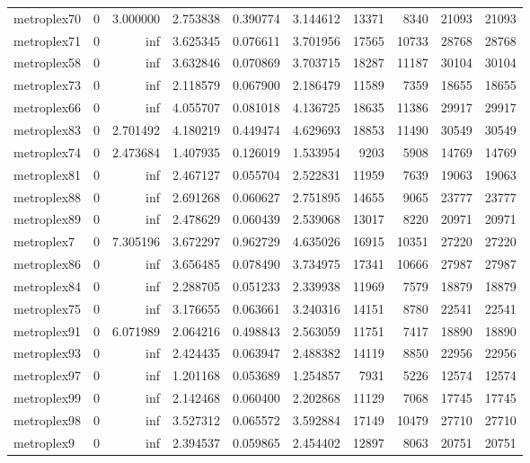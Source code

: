 \begin{longtable}{|l|r|r|r|r|r|r|r|r|r|}
metroplex70 & 0 & 3.000000 & 2.753838 & 0.390774 & 3.144612 & 13371 & 8340 & 21093 & 21093 \\
metroplex71 & 0 & inf & 3.625345 & 0.076611 & 3.701956 & 17565 & 10733 & 28768 & 28768 \\
metroplex58 & 0 & inf & 3.632846 & 0.070869 & 3.703715 & 18287 & 11187 & 30104 & 30104 \\
metroplex73 & 0 & inf & 2.118579 & 0.067900 & 2.186479 & 11589 & 7359 & 18655 & 18655 \\
metroplex66 & 0 & inf & 4.055707 & 0.081018 & 4.136725 & 18635 & 11386 & 29917 & 29917 \\
metroplex83 & 0 & 2.701492 & 4.180219 & 0.449474 & 4.629693 & 18853 & 11490 & 30549 & 30549 \\
metroplex74 & 0 & 2.473684 & 1.407935 & 0.126019 & 1.533954 & 9203 & 5908 & 14769 & 14769 \\
metroplex81 & 0 & inf & 2.467127 & 0.055704 & 2.522831 & 11959 & 7639 & 19063 & 19063 \\
metroplex88 & 0 & inf & 2.691268 & 0.060627 & 2.751895 & 14655 & 9065 & 23777 & 23777 \\
metroplex89 & 0 & inf & 2.478629 & 0.060439 & 2.539068 & 13017 & 8220 & 20971 & 20971 \\
metroplex7 & 0 & 7.305196 & 3.672297 & 0.962729 & 4.635026 & 16915 & 10351 & 27220 & 27220 \\
metroplex86 & 0 & inf & 3.656485 & 0.078490 & 3.734975 & 17341 & 10666 & 27987 & 27987 \\
metroplex84 & 0 & inf & 2.288705 & 0.051233 & 2.339938 & 11969 & 7579 & 18879 & 18879 \\
metroplex75 & 0 & inf & 3.176655 & 0.063661 & 3.240316 & 14151 & 8780 & 22541 & 22541 \\
metroplex91 & 0 & 6.071989 & 2.064216 & 0.498843 & 2.563059 & 11751 & 7417 & 18890 & 18890 \\
metroplex93 & 0 & inf & 2.424435 & 0.063947 & 2.488382 & 14119 & 8850 & 22956 & 22956 \\
metroplex97 & 0 & inf & 1.201168 & 0.053689 & 1.254857 & 7931 & 5226 & 12574 & 12574 \\
metroplex99 & 0 & inf & 2.142468 & 0.060400 & 2.202868 & 11129 & 7068 & 17745 & 17745 \\
metroplex98 & 0 & inf & 3.527312 & 0.065572 & 3.592884 & 17149 & 10479 & 27710 & 27710 \\
metroplex9 & 0 & inf & 2.394537 & 0.059865 & 2.454402 & 12897 & 8063 & 20751 & 20751 \\

\end{longtable}

